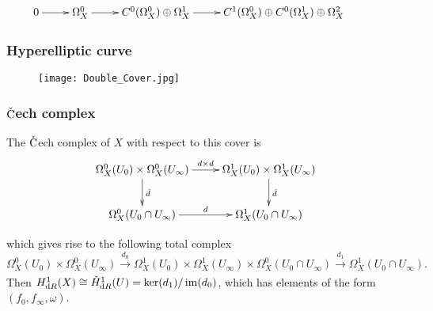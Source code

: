 \documentclass{beamer}
\begin{document}
\begin{frame}
{\begin{displaymath}
\xymatrix{
0 \ar[r]  & \Omega_X^0 \ar[r] & C^0(\Omega_X^0) \oplus \Omega_X^1  \ar[r] & C^1(\Omega_X^0) \oplus C^0(\Omega_X^1) \oplus \Omega_X^2 & 
}
\end{displaymath}}
\end{frame}




\begin{frame}
\frametitle{Hyperelliptic curve}
\begin{figure}
\texttt{[image: Double\_Cover.jpg]}
\end{figure}
\end{frame}




\begin{frame}
\frametitle{$\check{\text C}$ech complex}
The $\check {\text C}$ech complex of $X$ with respect to this cover is
\begin{displaymath}
    \xymatrix{
        \Omega^0_X(U_0)\times \Omega_X^0(U_\infty) \ar[r]^{d \times d} \ar[d]^{\check d} & \Omega^1_X(U_0) \times \Omega_X^1(U_\infty) \ar[d]^{\check d} \\
        \Omega_X^0(U_0\cap U_\infty) \ar[r]^{d}                      & \Omega_X^1(U_0 \cap U_\infty)
    }
\end{displaymath}
\pause

which gives rise to the following total complex
\begin{equation*}
\Omega^0_X(U_0) \times \Omega_X^0(U_\infty) \xrightarrow[]{d_0} \Omega_X^1(U_0)\times \Omega_X^1(U_\infty) \times \Omega_X^0(U_0 \cap U_\infty) \xrightarrow[]{d_1} \Omega^1_X(U_0 \cap U_\infty).
\end{equation*}
\pause
Then $H^1_{\text dR}(X) \cong \check{H}^1_{\text dR}(U) = \operatorname{ker}(d_1)/\operatorname{im}(d_0)$, which has elements of the form $(f_0, f_\infty , \omega)$.
\end{frame}
\end{document}
